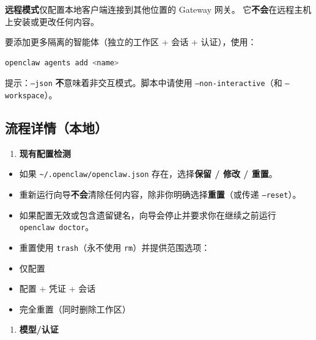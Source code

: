 \textbf{远程模式}仅配置本地客户端连接到其他位置的 Gateway 网关。
它\textbf{不会}在远程主机上安装或更改任何内容。

要添加更多隔离的智能体（独立的工作区 + 会话 + 认证），使用：

\begin{lstlisting}[language=bash]
openclaw agents add <name>
\end{lstlisting}


提示：\texttt{--json} \textbf{不}意味着非交互模式。脚本中请使用 \texttt{--non-interactive}（和 \texttt{--workspace}）。

\subsection{流程详情（本地）}


\begin{enumerate}
  \item \textbf{现有配置检测}
\end{enumerate}

\begin{itemize}
  \item 如果 \texttt{\textasciitilde{}/.openclaw/openclaw.json} 存在，选择\textbf{保留 / 修改 / 重置}。
  \item 重新运行向导\textbf{不会}清除任何内容，除非你明确选择\textbf{重置}（或传递 \texttt{--reset}）。
  \item 如果配置无效或包含遗留键名，向导会停止并要求你在继续之前运行 \texttt{openclaw doctor}。
  \item 重置使用 \texttt{trash}（永不使用 \texttt{rm}）并提供范围选项：
  \item 仅配置
  \item 配置 + 凭证 + 会话
  \item 完全重置（同时删除工作区）
\end{itemize}


\begin{enumerate}
  \item \textbf{模型/认证}
\end{enumerate}

